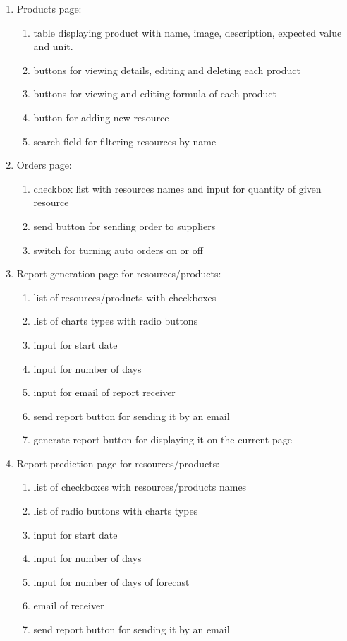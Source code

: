 \documentclass[a4paper,11pt,twoside]{report}
\theoremstyle{definition}
\begin{document}
\begin{enumerate}
\item Products page:
\begin{enumerate}
\item table displaying product with name, image, description, expected value and unit.
\item buttons for viewing details, editing and deleting each product
\item buttons for viewing and editing formula of each product
\item button for adding new resource
\item search field for filtering resources by name
\end{enumerate} 
\item Orders page:
\begin{enumerate}
\item checkbox list with resources names and input for quantity of given resource
\item send button for sending order to suppliers
\item switch for turning auto orders on or off
\end{enumerate}
\item Report generation page for resources/products:
\begin{enumerate}
\item list of resources/products with checkboxes
\item list of charts types with radio buttons
\item input for start date
\item input for number of days 
\item input for email of  report receiver
\item send report button for sending it by an email
\item generate report button for displaying it on the current page
\end{enumerate}
\item Report prediction page for resources/products:
\begin{enumerate}
\item list of  checkboxes with resources/products names
\item list of radio buttons with charts types
\item input for start date
\item input for number of days
\item input for number of days of forecast
\item email of receiver
\item send report button for sending it by an email

\end{enumerate}
\end{enumerate}
\end{document}

